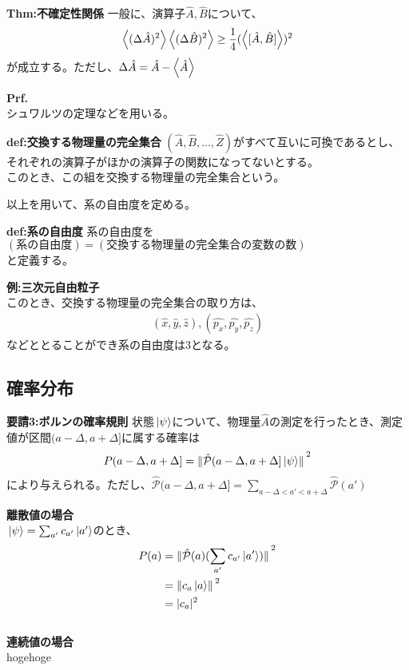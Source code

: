 \documentclass[a4paper,11pt]{jsarticle}
\begin{document}
\begin{itembox}[l]{\textbf {Thm:不確定性関係}}
  一般に、演算子$\hat{A},\hat{B}$について、
    \begin{align}
       \ev{(\Delta \hat{A})^2}\ev{(\Delta \hat{B})^2}\geq \frac{1}{4}(\ev{[\hat{A},\hat{B}]})^2
    \end{align}
   が成立する。ただし、$\Delta \hat{A} = {\hat{A} - \ev{\hat{A}}}$
    \end{itembox}
\textbf{Prf.}\\
シュワルツの定理などを用いる。\\

\begin{itembox}[l]{\textbf {def:交換する物理量の完全集合}}
    $(\hat{A},\hat{B},\dots,\hat{Z})$がすべて互いに可換であるとし、それぞれの演算子がほかの演算子の関数になってないとする。\\
     このとき、この組を交換する物理量の完全集合という。
      \end{itembox}
以上を用いて、系の自由度を定める。
\begin{itembox}[l]{\textbf {def:系の自由度}}
  系の自由度を\\
  $(系の自由度)=(交換する物理量の完全集合の変数の数)$\\
  と定義する。
    \end{itembox}      
\textbf{例:三次元自由粒子}\\
このとき、交換する物理量の完全集合の取り方は、
\begin{align}
    (\hat{x},\hat{y},\hat{z}),(\hat{p_x},\hat{p_y},\hat{p_z})
\end{align}
などととることができ系の自由度は3となる。
\subsection{確率分布}
\begin{itembox}[l]{\textbf {要請3:ボルンの確率規則}}
    状態$\ket*{\psi}$について、物理量$\hat{A}$の測定を行ったとき、測定値が区間$(a-\Delta,a+\Delta]$に属する確率は
    \begin{align}
        P(a-\Delta,a+\Delta] = \norm*{\hat{\mathcal{P}}(a-\Delta,a+\Delta]\ket*{\psi}}^2
    \end{align}
    により与えられる。ただし、$\hat{\mathcal{P}}(a-\Delta,a+\Delta]=\sum_{a-\Delta<a'<a+\Delta}\hat{\mathcal{P}}(a')$
    \end{itembox}
\textbf{離散値の場合}\\
$\ket*{\psi}=\sum_{a'} c_{a'} \ket*{a'}$のとき、
\begin{align}
    P(a)&=\norm*{\hat{\mathcal{P}}(a) (\sum_{a'} c_{a'} \ket*{a'})}^2\\
    &=\norm*{c_{a}\ket*{a}}^2\\
    &=|c_a|^2
\end{align}\\
\textbf{連続値の場合}\\
hogehoge\\
\end{document}
